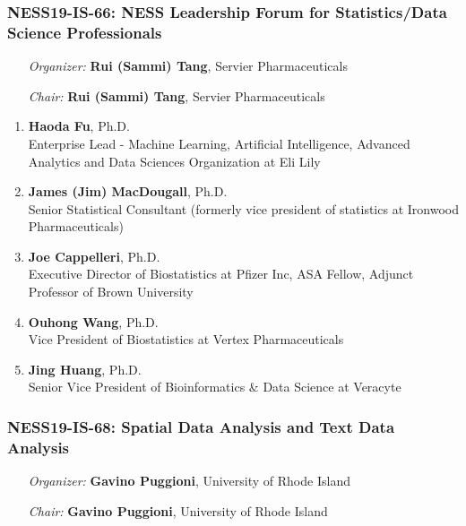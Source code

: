 \subsubsection*{NESS19-IS-66: NESS Leadership Forum for Statistics/Data Science Professionals}

\begin{enumerate}[align=left]
\item [\emph{Organizer:}] \textbf{Rui (Sammi) Tang}, Servier Pharmaceuticals
\item [\emph{Chair:}] \textbf{Rui (Sammi) Tang},  Servier Pharmaceuticals
\end{enumerate}

\begin{enumerate}
\item \textbf{Haoda Fu},  Ph.D. \\
 Enterprise Lead - Machine Learning, Artificial Intelligence, Advanced Analytics and Data Sciences Organization at Eli Lily
\item \textbf{James (Jim) MacDougall},  Ph.D. \\
 Senior Statistical Consultant (formerly vice president of statistics at Ironwood Pharmaceuticals)
\item \textbf{Joe Cappelleri},  Ph.D. \\
 Executive Director of Biostatistics at Pfizer Inc, ASA Fellow, Adjunct Professor of Brown University
\item \textbf{Ouhong Wang},  Ph.D. \\
 Vice President of Biostatistics at Vertex Pharmaceuticals
\item \textbf{Jing Huang},  Ph.D. \\
 Senior Vice President of Bioinformatics \& Data Science at Veracyte
\end{enumerate}

\subsubsection*{NESS19-IS-68: Spatial Data Analysis and Text Data Analysis}

\begin{enumerate}[align=left]
\item [\emph{Organizer:}] \textbf{Gavino Puggioni}, University of Rhode Island
\item [\emph{Chair:}] \textbf{Gavino Puggioni}, University of Rhode Island
\end{enumerate}

